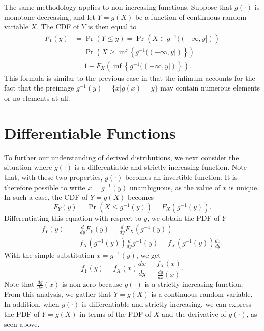 The same methodology applies to non-increasing functions.
Suppose that $g(\cdot)$ is monotone decreasing, and let $Y = g(X)$ be a function of continuous random variable $X$.
The CDF of $Y$ is then equal to
\begin{equation} \label{equation:MonotoneDecreasingCDF}
\begin{split}
F_Y(y) &= \Pr (Y \leq y) = \Pr \left( X \in g^{-1} ((-\infty, y]) \right) \\
&= \Pr \left( X \geq \inf \left\{ g^{-1} ((-\infty, y]) \right\} \right) \\
&= 1 - F_X \left( \inf \left\{ g^{-1} ((-\infty, y] ) \right\} \right) .
\end{split}
\end{equation}
This formula is similar to the previous case in that the infimum accounts for the fact that the preimage $g^{-1}(y) = \{ x | g(x) = y \}$ may contain numerous elements or no elements at all.


\section{Differentiable Functions}

To further our understanding of derived distributions, we next consider the situation where $g(\cdot)$ is a differentiable and strictly increasing function.
Note that, with these two properties, $g(\cdot)$ becomes an invertible function.
It is therefore possible to write $x = g^{-1} (y)$ unambiguous, as the value of $x$ is unique.
In such a case, the CDF of $Y = g(X)$ becomes
\begin{equation*}
F_Y(y) = \Pr \left( X \leq g^{-1}(y) \right)
= F_X \left( g^{-1} (y) \right) .
\end{equation*}
Differentiating this equation with respect to $y$, we obtain the PDF of $Y$
\begin{equation*}
\begin{split}
f_Y (y) &= \frac{d}{dy} F_Y(y)
= \frac{d}{dy} F_X \left( g^{-1} (y) \right) \\
&= f_X \left( g^{-1} (y) \right) \frac{d}{dy} g^{-1} (y)
= f_X \left( g^{-1} (y) \right) \frac{dx}{dy} .
\end{split}
\end{equation*}
With the simple substitution $x = g^{-1} (y)$, we get
\begin{equation*}
f_Y (y) = f_X (x) \frac{dx}{dy}
= \frac{f_X (x)}{\frac{dg}{dx}(x)} .
\end{equation*}
Note that $\frac{dg}{dx} (x)$ is non-zero because $g(\cdot)$ is a strictly increasing function.
From this analysis, we gather that $Y=g(X)$ is a continuous random variable.
In addition, when $g(\cdot)$ is differentiable and strictly increasing, we can express the PDF of $Y = g(X)$ in terms of the PDF of $X$ and the derivative of $g(\cdot)$, as seen above.

